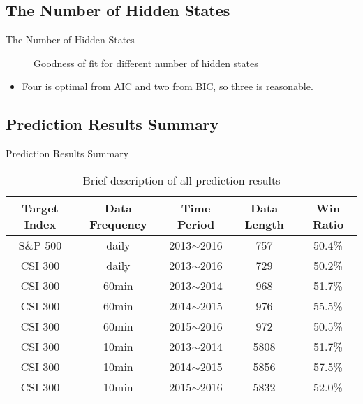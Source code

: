 
\subsection{The Number of Hidden States}

\begin{frame}[fragile,t]{The Number of Hidden States}
	\begin{figure}[!hbt]
    \begin{center}
    \end{center}
    \caption{Goodness of fit for different number of hidden states}
    \label{fig:result:states}
    \end{figure}

    \vspace*{-1em}
    \begin{itemize}
	\item Four is optimal from AIC and two from BIC, so three is reasonable.
	\end{itemize}
\end{frame}


\subsection{Prediction Results Summary}

\begin{frame}[fragile]{Prediction Results Summary}
	\begin{table}[!hbt]
    \center
    \caption{Brief description of all prediction results}
    \label{table:results}
    \begin{tabular}{c c c c c}
    \hline
    Target Index  &  Data Frequency  &  Time Period  &  Data Length  &  Win Ratio  \\
    \hline
    S\&P 500  &  daily  &  2013$\sim$2016  &  757  &  50.4\%  \\
    CSI 300   &  daily  &  2013$\sim$2016  &  729  &  50.2\%  \\
    CSI 300   &  60min  &  2013$\sim$2014  &  968  &  51.7\%  \\
    CSI 300   &  60min  &  2014$\sim$2015  &  976  &  55.5\%  \\
    CSI 300   &  60min  &  2015$\sim$2016  &  972  &  50.5\%  \\
    CSI 300   &  10min  &  2013$\sim$2014  &  5808  &  51.7\%  \\
    CSI 300   &  10min  &  2014$\sim$2015  &  5856  &  57.5\%  \\
    CSI 300   &  10min  &  2015$\sim$2016  &  5832  &  52.0\%  \\
    \hline
    \end{tabular}
    \end{table}
\end{frame}
